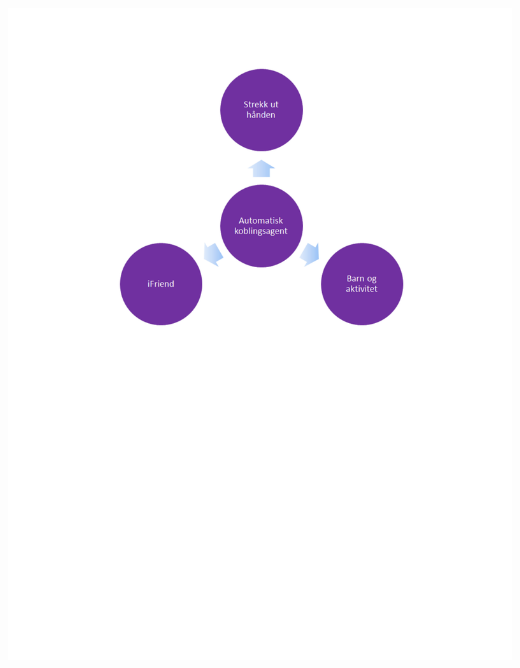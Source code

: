 \begin{center}
\includegraphics[clip=true, width=1 \textwidth,
trim=0cm 0cm 0cm 0cm]{automatiskKoblingsagent.pdf}
\label{fig:automatiskKoblingsagent}
\end{center}
